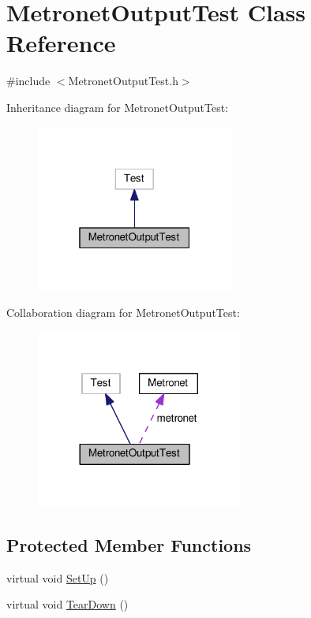 \hypertarget{class_metronet_output_test}{}\section{Metronet\+Output\+Test Class Reference}
\label{class_metronet_output_test}


{\ttfamily \#include $<$Metronet\+Output\+Test.\+h$>$}



Inheritance diagram for Metronet\+Output\+Test\+:
\nopagebreak
\begin{figure}[H]
\begin{center}
\leavevmode
\includegraphics[width=184pt]{class_metronet_output_test__inherit__graph}
\end{center}
\end{figure}


Collaboration diagram for Metronet\+Output\+Test\+:
\nopagebreak
\begin{figure}[H]
\begin{center}
\leavevmode
\includegraphics[width=192pt]{class_metronet_output_test__coll__graph}
\end{center}
\end{figure}
\subsection*{Protected Member Functions}
\begin{DoxyCompactItemize}
\item 
virtual void \hyperlink{class_metronet_output_test_a591685e65362fe63b325e2d33189a3b0}{Set\+Up} ()
\item 
virtual void \hyperlink{class_metronet_output_test_a1390ab64ffdb3c5da39c4b27b40c170a}{Tear\+Down} ()
\end{DoxyCompactItemize}
